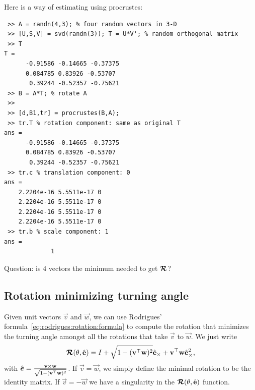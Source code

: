 Here is a way of estimating using procrustes:
\begin{verbatim}
 >> A = randn(4,3); % four random vectors in 3-D
 >> [U,S,V] = svd(randn(3)); T = U*V'; % random orthogonal matrix
 >> T
T =
      -0.91586 -0.14665 -0.37375
      0.084785 0.83926 -0.53707
       0.39244 -0.52357 -0.75621
 >> B = A*T; % rotate A
 >>
 >> [d,B1,tr] = procrustes(B,A);
 >> tr.T % rotation component: same as original T
ans =
      -0.91586 -0.14665 -0.37375
      0.084785 0.83926 -0.53707
       0.39244 -0.52357 -0.75621
 >> tr.c % translation component: 0
ans =
    2.2204e-16 5.5511e-17 0
    2.2204e-16 5.5511e-17 0
    2.2204e-16 5.5511e-17 0
    2.2204e-16 5.5511e-17 0
 >> tr.b % scale component: 1
ans =
             1
\end{verbatim}

Question: is 4 vectors the minimum needed to get $\boldsymbol{\mathcal{R}}$?

\subsection{Rotation minimizing turning angle}

Given unit vectors $\vec v$ and $\vec w$, we can use Rodrigues'
formula~\eqref{eq:rodrigues:rotation:formula} to compute the rotation that
minimizes the turning angle amongst all the rotations that take $\vec v$ to
$\vec w$. We just write
\begin{equation}
\boldsymbol{\mathcal{R}}(\theta,\hat{\mathbf e}) = I + \sqrt{1 - (\mathbf{v}^\top\mathbf{w})^2}\hat{\mathbf e}_\times
+ \mathbf{v}^\top\mathbf{w}\hat{\mathbf e}_\times^2,
\end{equation}
with $\hat {\boldsymbol{e}} = \frac{\mathbf{v} \times \mathbf{w}}{\sqrt{1 - (\mathbf{v}^\top\mathbf{w})^2}}$.
If $\vec v =  \vec w$, we simply define the minimal rotation to be the identity
matrix. If $\vec v =  -\vec w$ we have a singularity in the
$\boldsymbol{\mathcal{R}}(\theta,\hat{\mathbf e})$ function.
